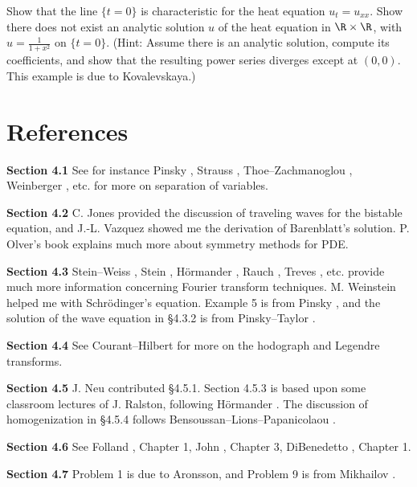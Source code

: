 \begin{exercise}
Show that the line $\{t=0\}$ is characteristic for the heat equation $u_t=u_{xx}$. Show there does not exist an analytic solution $u$ of the heat equation in $\R \times \R$, with $u=\frac{1}{1+x^2}$ on $\{t=0\}$. (Hint: Assume there is an analytic solution, compute its coefficients, and show that the resulting power series diverges except at $(0,0)$. This example is due to Kovalevskaya.)
\end{exercise}

\section{References}
\label{sec:ch4-references}

\textbf{Section 4.1} \quad See for instance Pinsky \cite{Pinsky1991}, Strauss \cite{Strauss1992}, Thoe--Zachmanoglou \cite{ThoeZachmanoglou1986}, Weinberger \cite{Weinberger1965}, etc. for more on separation of variables.

\textbf{Section 4.2} \quad C. Jones provided the discussion of traveling waves for the bistable equation, and J.-L. Vazquez showed me the derivation of Barenblatt's solution. P. Olver's book \cite{Olver1986} explains much more about symmetry methods for PDE.

\textbf{Section 4.3} \quad Stein--Weiss \cite{SteinWeiss1971}, Stein \cite{Stein1993}, H\"ormander \cite{Hormander1983}, Rauch \cite{Rauch1992}, Treves \cite{Treves1975}, etc. provide much more information concerning Fourier transform techniques. M. Weinstein helped me with Schr\"odinger's equation. Example 5 is from Pinsky \cite{Pinsky1991}, and the solution of the wave equation in \S4.3.2 is from Pinsky--Taylor \cite{PinskyTaylor1997}.

\textbf{Section 4.4} \quad See Courant--Hilbert \cite{CourantHilbert1962} for more on the hodograph and Legendre transforms.

\textbf{Section 4.5} \quad J. Neu contributed \S4.5.1. Section 4.5.3 is based upon some classroom lectures of J. Ralston, following H\"ormander \cite{Hormander1971}. The discussion of homogenization in \S4.5.4 follows Bensoussan--Lions--Papanicolaou \cite{BensoussanLionsPapanicolaou1978}.

\textbf{Section 4.6} \quad See Folland \cite{Folland1976}, Chapter 1, John \cite{John1982}, Chapter 3, DiBenedetto \cite{DiBenedetto1995}, Chapter 1.

\textbf{Section 4.7} \quad Problem 1 is due to Aronsson, and Problem 9 is from Mikhailov \cite{Mikhailov1978}.
